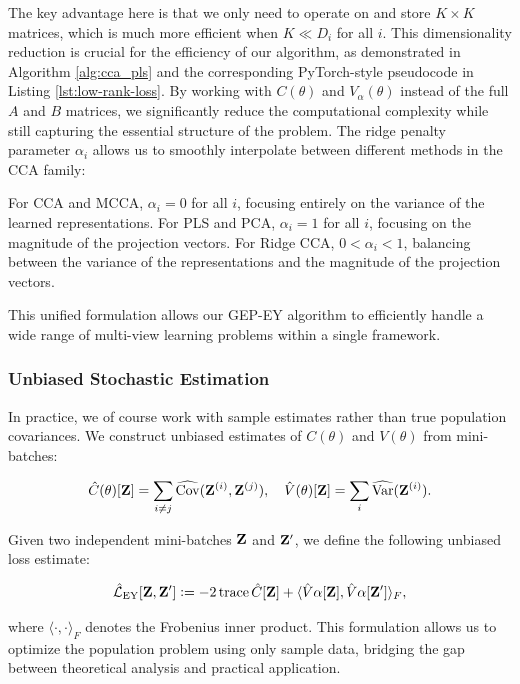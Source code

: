 The key advantage here is that we only need to operate on and store $K \times K$ matrices, which is much more efficient when $K \ll D_i$ for all $i$. This dimensionality reduction is crucial for the efficiency of our algorithm, as demonstrated in Algorithm \ref{alg:cca_pls} and the corresponding PyTorch-style pseudocode in Listing \ref{lst:low-rank-loss}.
By working with $C(\theta)$ and $V_\alpha(\theta)$ instead of the full $A$ and $B$ matrices, we significantly reduce the computational complexity while still capturing the essential structure of the problem. The ridge penalty parameter $\alpha_i$ allows us to smoothly interpolate between different methods in the CCA family:

For CCA and MCCA, $\alpha_i = 0$ for all $i$, focusing entirely on the variance of the learned representations.
For PLS and PCA, $\alpha_i = 1$ for all $i$, focusing on the magnitude of the projection vectors.
For Ridge CCA, $0 < \alpha_i < 1$, balancing between the variance of the representations and the magnitude of the projection vectors.

This unified formulation allows our GEP-EY algorithm to efficiently handle a wide range of multi-view learning problems within a single framework.

\subsubsection{Unbiased Stochastic Estimation}
In practice, we of course work with sample estimates rather than true population covariances. We construct unbiased estimates of $C(\theta)$ and $V(\theta)$ from mini-batches:

\begin{align}\label{eq:def-C-V-matrices-empirical}
\hat{C}(\theta)[\mathbf{Z}] = \sum_{i \neq j} \widehat{\mathrm{Cov}}(\mathbf{Z}^{(i)}, \mathbf{Z}^{(j)}), \quad
\hat{V}(\theta)[\mathbf{Z}] = \sum_{i} \widehat{\mathrm{Var}}(\mathbf{Z}^{(i)}).
\end{align}

Given two independent mini-batches $\mathbf{Z}$ and $\mathbf{Z}'$, we define the following unbiased loss estimate:

\begin{align}\label{eq:empirical-EY-loss-estimate-def}
\hat{\mathcal{L}}_\text{EY}[\mathbf{Z}, \mathbf{Z}'] \vcentcolon= - 2 \operatorname{trace} \hat{C}[\mathbf{Z}] + \langle \hat{V}\alpha[\mathbf{Z}], \hat{V}\alpha[\mathbf{Z}'] \rangle_F,
\end{align}

where $\langle \cdot, \cdot \rangle_F$ denotes the Frobenius inner product. This formulation allows us to optimize the population problem using only sample data, bridging the gap between theoretical analysis and practical application.
